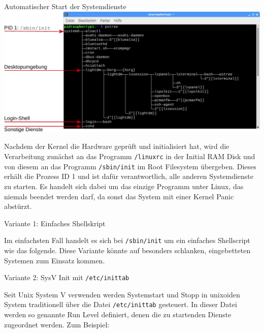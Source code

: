 {
\footnotesize

\begin{frame}[allowframebreaks]{Automatischer Start der Systemdienste}
    \includegraphics[width=\textwidth]{8-linux/img/pid1-pstree}
    \medskip

    \parbox{\linewidth}{
        Nachdem der Kernel die Hardware geprüft und initialisiert hat, wird die
        Verarbeitung zunächst an das Programm \texttt{/linuxrc} in der Initial
        RAM Disk und von diesem an das Programm \texttt{/sbin/init} im Root
        Filesystem übergeben. Dieses erhält die Prozess ID 1 und ist dafür
        verantwortlich, alle anderen Systemdienste zu starten. Es handelt sich
        dabei um das einzige Programm unter Linux, das niemals beendet werden
        darf, da sonst das System mit einer Kernel Panic abstürzt.
    }

    \framebreak

    \begin{block}{Variante 1: Einfaches Shellskript}
        \smallskip
        \parbox{\linewidth}{
            Im einfachsten Fall handelt es sich bei \texttt{/sbin/init} um ein
            einfaches Shellscript wie das folgende. Diese Variante könnte auf
            besonders schlanken, eingebetteten Systemen zum Einsatz kommen.
        }

        
    \end{block}

    \framebreak

    \begin{block}{Variante 2: SysV Init mit \texttt{/etc/inittab}}
        \smallskip
        \parbox{\linewidth}{
            Seit Unix System V verwenden werden Systemstart und Stopp in unixoiden
            System traditionell über die Datei \texttt{/etc/inittab} gesteuert.
            In dieser Datei werden so genannte Run Level definiert, denen die
            zu startenden Dienste zugeordnet werden. Zum Beispiel:
        }


\end{block}
\end{frame}}
